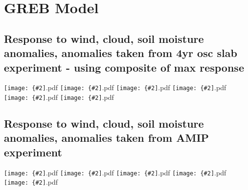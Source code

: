 \documentclass[12pt,a4paper]{article}
\newcommand{\pdffig}[2][0.5]{\texttt{[image: \{\#2]}.pdf}}
\begin{document}
\section{GREB Model}
\subsection{Response to wind, cloud, soil moisture anomalies, anomalies taken 
from 4yr osc slab experiment - using composite of max response}

\pdffig[0.5]{tsfc_dif.cld.pos.4ycomp}
\pdffig[0.5]{tsfc_dif.smc.pos.4ycomp}
\pdffig[0.5]{tsfc_dif.u_anom.pos.4ycomp}
\pdffig[0.5]{tsfc_dif.uv_anom.pos.4ycomp}
\pdffig[0.5]{tsfc_dif.v_anom.pos.4ycomp}
\pdffig[0.5]{tsfc_dif.all.pos.4ycomp}

\subsection{Response to wind, cloud, soil moisture anomalies, anomalies taken 
from AMIP experiment}

\pdffig[0.5]{tsfc_dif.cld.pos}
\pdffig[0.5]{tsfc_dif.smc.pos}
\pdffig[0.5]{tsfc_dif.u_anom.pos}
\pdffig[0.5]{tsfc_dif.uv_anom.pos}
\pdffig[0.5]{tsfc_dif.v_anom.pos}
\end{document}
